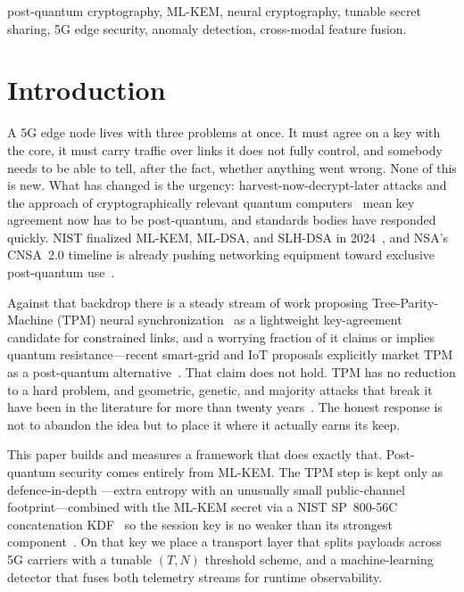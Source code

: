 \documentclass[conference]{IEEEtran}
\begin{document}
\begin{IEEEkeywords}
post-quantum cryptography, ML-KEM, neural cryptography, tunable secret sharing,
5G edge security, anomaly detection, cross-modal feature fusion.
\end{IEEEkeywords}

\section{Introduction}
A 5G edge node lives with three problems at once. It must agree on a key with the
core, it must carry traffic over links it does not fully control, and somebody needs
to be able to tell, after the fact, whether anything went wrong. None of this is new.
What has changed is the urgency: harvest-now-decrypt-later attacks and the approach
of cryptographically relevant quantum computers~\cite{shor1997polynomial} mean key
agreement now has to be post-quantum, and standards bodies have responded quickly.
NIST finalized ML-KEM, ML-DSA, and SLH-DSA in 2024~\cite{fips203,fips204,fips205},
and NSA's CNSA~2.0 timeline is already pushing networking equipment toward exclusive
post-quantum use~\cite{cnsa2}.

Against that backdrop there is a steady stream of work proposing Tree-Parity-Machine
(TPM) neural synchronization~\cite{kanter2002secure,rosenzvi2002mutual} as a
lightweight key-agreement candidate for constrained links, and a worrying fraction of
it claims or implies quantum resistance---recent smart-grid and IoT proposals
explicitly market TPM as a post-quantum alternative~\cite{stypinski2023smartgrid}.
That claim does not hold. TPM has no reduction to a hard problem, and geometric,
genetic, and majority attacks that break it have been in the literature for more than
twenty years~\cite{klimov2002analysis,ruttor2006genetic,shacham2004cooperating}. The
honest response is not to abandon the idea but to place it where it actually earns
its keep.

This paper builds and measures a framework that does exactly that. Post-quantum
security comes entirely from ML-KEM. The TPM step is kept only as defence-in-depth
---extra entropy with an unusually small public-channel footprint---combined with the
ML-KEM secret via a NIST SP~800-56C concatenation KDF~\cite{sp80056c} so the
session key is no weaker than its strongest component~\cite{stebila2023hybrid}. On
that key we place a transport layer that splits payloads across 5G carriers with a
tunable $(T,N)$ threshold scheme, and a machine-learning detector that fuses both
telemetry streams for runtime observability.
\end{document}
